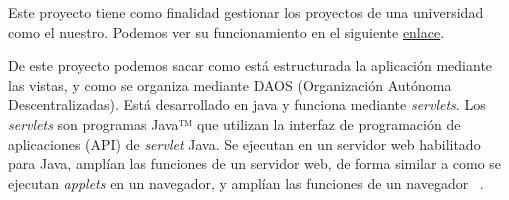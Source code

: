 Este proyecto tiene como finalidad gestionar los proyectos de una universidad como el nuestro. Podemos ver su funcionamiento en el siguiente \href{https://github.com/amujica/Gestion-TFG}{enlace}.

De este proyecto podemos sacar como está estructurada la aplicación mediante las vistas, y como se organiza mediante DAOS (Organización Autónoma Descentralizadas).
Está desarrollado en java y funciona mediante \emph{servlets}.
Los \emph{servlets} son programas Java™ que utilizan la interfaz de programación de aplicaciones (API) de \emph{servlet} Java. Se ejecutan en un servidor web habilitado para Java, amplían las funciones de un servidor web, de forma similar a como se ejecutan \emph{applets} en un navegador, y amplían las funciones de un navegador ~\cite{servlets}.

